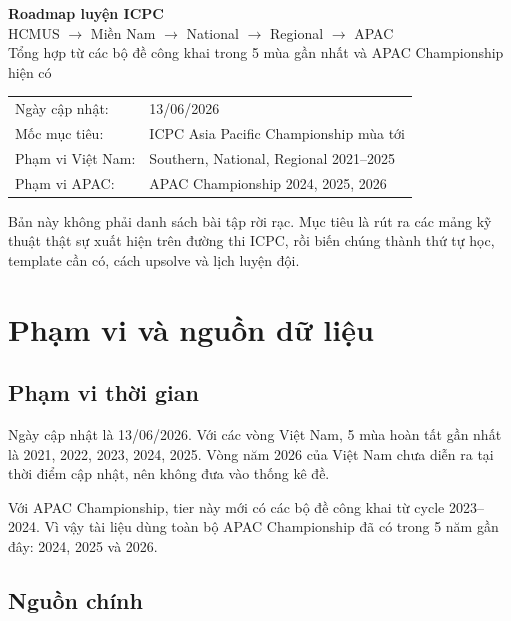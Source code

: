 \documentclass[11pt,a4paper]{article}
\begin{document}
\begin{titlepage}
  \vspace*{1.2cm}
  {\Huge\bfseries\color{deepblue} Roadmap luyện ICPC}\\[0.35cm]
  {\Large HCMUS $\rightarrow$ Miền Nam $\rightarrow$ National $\rightarrow$ Regional $\rightarrow$ APAC}\\[0.8cm]
  {\large Tổng hợp từ các bộ đề công khai trong 5 mùa gần nhất và APAC Championship hiện có}\\[1.2cm]

  \begin{tabular}{@{}ll@{}}
    Ngày cập nhật: & 13/06/2026\\
    Mốc mục tiêu: & ICPC Asia Pacific Championship mùa tới\\
    Phạm vi Việt Nam: & Southern, National, Regional 2021--2025\\
    Phạm vi APAC: & APAC Championship 2024, 2025, 2026\\
  \end{tabular}

  \vfill
  \noindent
  Bản này không phải danh sách bài tập rời rạc. Mục tiêu là rút ra các mảng kỹ thuật thật sự xuất hiện trên đường thi ICPC, rồi biến chúng thành thứ tự học, template cần có, cách upsolve và lịch luyện đội.
\end{titlepage}

\tableofcontents
\newpage

\section{Phạm vi và nguồn dữ liệu}

\subsection{Phạm vi thời gian}

Ngày cập nhật là 13/06/2026. Với các vòng Việt Nam, 5 mùa hoàn tất gần nhất là 2021, 2022, 2023, 2024, 2025. Vòng năm 2026 của Việt Nam chưa diễn ra tại thời điểm cập nhật, nên không đưa vào thống kê đề.

Với APAC Championship, tier này mới có các bộ đề công khai từ cycle 2023--2024. Vì vậy tài liệu dùng toàn bộ APAC Championship đã có trong 5 năm gần đây: 2024, 2025 và 2026.

\subsection{Nguồn chính}
\end{document}
